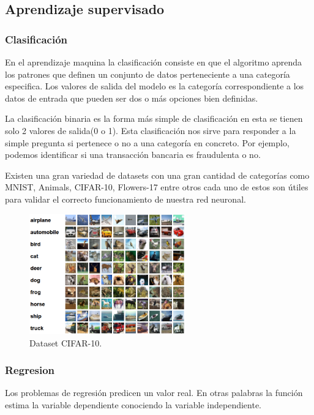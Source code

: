 \subsection{Aprendizaje supervisado}


\subsubsection{Clasificación}

En el aprendizaje maquina la clasificación consiste en que el algoritmo aprenda los patrones que definen un conjunto de datos perteneciente a una categoría especifica. Los valores de salida del modelo es la categoría correspondiente a los datos de entrada que pueden ser dos o más opciones bien definidas.

La clasificación binaria es la forma más simple de clasificación en esta se tienen solo 2 valores de salida(0 o 1). Esta clasificación nos sirve para responder a la simple pregunta si pertenece o no a una categoría en concreto. Por ejemplo, podemos identificar si una transacción bancaria es fraudulenta o no.

Existen una gran variedad de datasets con una gran cantidad de categorías como MNIST, Animals, CIFAR-10, Flowers-17 entre otros cada uno de estos son útiles para validar el correcto funcionamiento de nuestra red neuronal.

\begin{figure}[H]
    \centering
    \includegraphics[width=0.6\textwidth]{MarcoTeorico/imgs/CIFAR-10.png}
    \caption{Dataset CIFAR-10.}
    \label{fig:cifar10}
\end{figure}

\subsubsection{Regresion}

Los problemas de regresión predicen un valor real. En otras palabras la función estima la variable dependiente conociendo la variable independiente.

